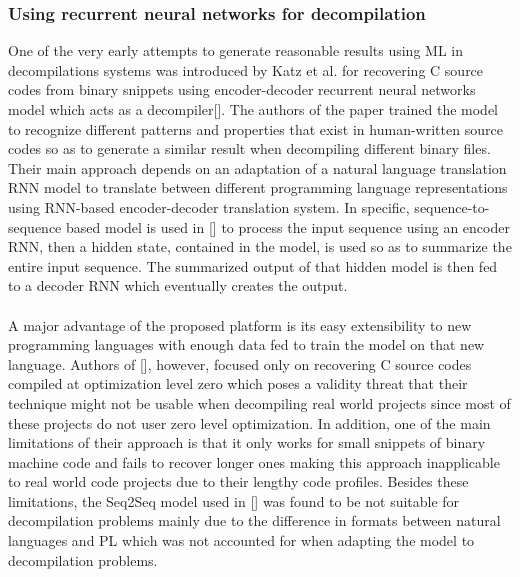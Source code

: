 \documentclass{article}
\begin{document}
\subsubsection{Using recurrent neural networks for decompilation}
\noindent One of the very early attempts to generate reasonable results using ML in decompilations systems was introduced by Katz et al. for recovering C source codes from binary snippets using encoder-decoder recurrent neural networks model which acts as a decompiler[].
The authors of the paper trained the model to recognize different patterns and properties that exist in human-written source codes so as to generate a similar result when decompiling different binary files.
Their main approach depends on an adaptation of a natural language translation RNN model to translate between different programming language representations using RNN-based encoder-decoder translation system.
In specific, sequence-to-sequence based model is used in [] to process the input sequence using an encoder RNN, then a hidden state, contained in the model, is used so as to summarize the entire input sequence.
The summarized output of that hidden model is then fed to a decoder RNN which eventually creates the output. \\\\
A major advantage of the proposed platform is its easy extensibility to new programming languages with enough data fed to train the model on that new language.
Authors of [], however, focused only on recovering C source codes compiled at optimization level zero which poses a validity threat that their technique might not be usable when decompiling real world projects since most of these projects do not user zero level optimization.
In addition, one of the main limitations of their approach is that it only works for small snippets of binary machine code and fails to recover longer ones making this approach inapplicable to real world code projects due to their lengthy code profiles.
Besides these limitations, the Seq2Seq model used in [] was found to be not suitable for decompilation problems mainly due to the difference in formats between natural languages and PL which was not accounted for when adapting the model to decompilation problems.\\\\
\end{document}

